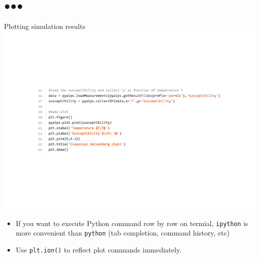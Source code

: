 \subsection*{{\protect\color{red}●}{\protect\color{blue}●}{\protect\color{green}●}}

\begin{frame}[t,fragile]{Plotting simulation results}
  \includegraphics[height=.5\textheight]{tutorial2a-3.pdf}
  \begin{itemize}
  \item If you want to execute Python command row by row on termial, {\color{red}\tt ipython} is more convenient than {\tt python} (tab completion, command history, etc)
  \item Use {\color{red}\tt plt.ion()} to reflect plot commands immediately.
  \end{itemize}
\end{frame}


